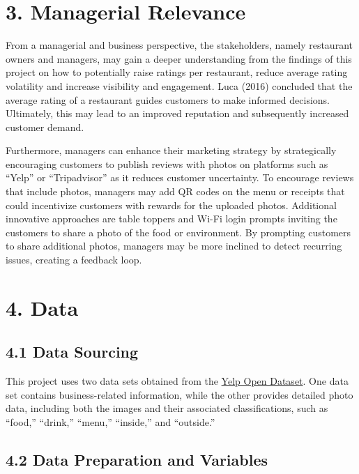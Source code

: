 \documentclass[
]{article}
\begin{document}
\section{3. Managerial Relevance}\label{managerial-relevance}

From a managerial and business perspective, the stakeholders, namely
restaurant owners and managers, may gain a deeper understanding from the
findings of this project on how to potentially raise ratings per
restaurant, reduce average rating volatility and increase visibility and
engagement. Luca (2016) concluded that the average rating of a
restaurant guides customers to make informed decisions. Ultimately, this
may lead to an improved reputation and subsequently increased customer
demand.

Furthermore, managers can enhance their marketing strategy by
strategically encouraging customers to publish reviews with photos on
platforms such as ``Yelp'' or ``Tripadvisor'' as it reduces customer
uncertainty. To encourage reviews that include photos, managers may add
QR codes on the menu or receipts that could incentivize customers with
rewards for the uploaded photos. Additional innovative approaches are
table toppers and Wi-Fi login prompts inviting the customers to share a
photo of the food or environment. By prompting customers to share
additional photos, managers may be more inclined to detect recurring
issues, creating a feedback loop.

\section{4. Data}\label{data}

\subsection{4.1 Data Sourcing}\label{data-sourcing}

This project uses two data sets obtained from the
\href{https://business.yelp.com/data/resources/open-dataset/}{Yelp Open
Dataset}. One data set contains business-related information, while the
other provides detailed photo data, including both the images and their
associated classifications, such as ``food,'' ``drink,'' ``menu,''
``inside,'' and ``outside.''

\subsection{4.2 Data Preparation and
Variables}\label{data-preparation-and-variables}
\end{document}
